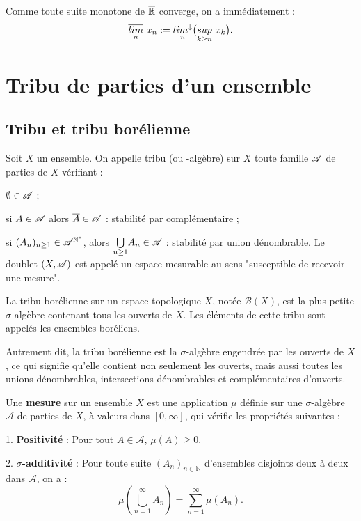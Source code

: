 \bn
Comme toute suite monotone de $\overline{\mathbb{R}}$ converge, on a immédiatement : $$\overline{\underset{n}{lim}} ~ x_n := \underset{n}{lim^{\downarrow}} \big(\underset{k \geq n}{sup}~x_k\big).$$
\en

\newpage

\section{Tribu de parties d'un ensemble}
\subsection{Tribu et tribu borélienne}

\bd[Tribu]
Soit $X$ un ensemble. On appelle tribu (ou \sigma-algèbre) sur $X$ toute famille $\mathscr{A}$ de parties de $X$ vérifiant : 
\ben
\item[(i)] $\emptyset \in \mathscr{A}$ ;
\item[(ii)] si $A \in \mathscr{A}$ alors $\overline{A} \in \mathscr{A}$ : stabilité par complémentaire ;
\item[(iii)] si $(A_n)_{n\geq 1} \in \mathscr{A}^{\mathbb{N}^*}$, alors $\underset{n\geq 1}{\bigcup} A_n \in \mathscr{A}$ : stabilité par union dénombrable.
\een
\ed
\bn
Le doublet $(X, \mathscr{A})$ est appelé un espace mesurable au sens "susceptible de recevoir une mesure".
\en

\bigskip

La tribu borélienne sur un espace topologique $X$, notée $\mathcal{B}(X)$, est la plus petite $\sigma$-algèbre contenant tous les ouverts de $X$. Les éléments de cette tribu sont appelés les ensembles boréliens.

Autrement dit, la tribu borélienne est la $\sigma$-algèbre engendrée par les ouverts de $X$, ce qui signifie qu'elle contient non seulement les ouverts, mais aussi toutes les unions dénombrables, intersections dénombrables et complémentaires d'ouverts.
\ed

\bigskip

Une \textbf{mesure} sur un ensemble $X$ est une application $\mu$ définie sur une $\sigma$-algèbre $\mathcal{A}$ de parties de $X$, à valeurs dans $[0, \infty]$, qui vérifie les propriétés suivantes :

1. \textbf{Positivité} : Pour tout $A \in \mathcal{A}$, $\mu(A) \geq 0$.

2. \textbf{$\sigma$-additivité} : Pour toute suite $(A_n)_{n \in \mathbb{N}}$ d'ensembles disjoints deux à deux dans $\mathcal{A}$, on a :
   \[
   \mu\left( \bigcup_{n=1}^{\infty} A_n \right) = \sum_{n=1}^{\infty} \mu(A_n).
   \]

